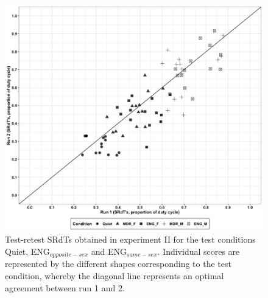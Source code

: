 \documentclass[a4paper, twoside]{templates/ociamthesis}
\begin{document}
\begin{figure}[ht]
\center
\includegraphics[scale=.11]{figures/Chapt1/Exp2_Run1_Run2_2021-01-29.png}
\caption{\label{fig:Exp2_2runs}{Test-retest SRdTs obtained in experiment II for the test conditions Quiet, ENG$_{opposite-sex}$ and ENG$_{same-sex}$. Individual scores are represented by the different shapes corresponding to the test condition, whereby the diagonal line represents an optimal agreement between run 1 and 2.}}
\end{figure} 
\end{document}
